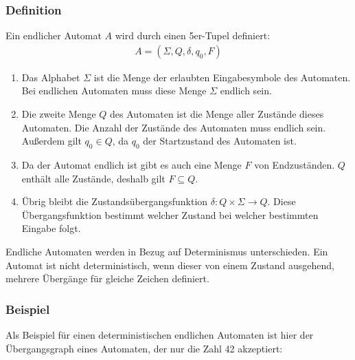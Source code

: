 \subsubsection{Definition}
\begin{flushleft}
Ein endlicher Automat $A$ wird durch einen 5er-Tupel definiert:
\begin{align}
    A=(\Sigma,Q,\delta,q_0,F)
\end{align}

\begin{enumerate}
    \item {
        Das Alphabet $\Sigma$ ist die Menge der erlaubten Eingabesymbole des Automaten.
        Bei endlichen Automaten muss diese Menge $\Sigma$ endlich sein.
    }
    \item {
        Die zweite Menge $Q$ des Automaten ist die Menge aller Zustände dieses
        Automaten.
        Die Anzahl der Zustände des Automaten muss endlich sein.
        Außerdem gilt $q_0 \in Q$, da $q_0$ der Startzustand des Automaten ist.
    }
    \item {
        Da der Automat endlich ist gibt es auch eine Menge $F$ von Endzuständen.
        $Q$ enthält alle Zustände, deshalb gilt $F \subseteq Q$.
    }
    \item {
        Übrig bleibt die Zustandsübergangsfunktion
        $\delta: Q \times \Sigma \rightarrow Q$.
        Diese Übergangsfunktion bestimmt welcher Zustand
        bei welcher bestimmten Eingabe folgt.
    }
\end{enumerate}

Endliche Automaten werden in Bezug auf Determinismus unterschieden.
Ein Automat ist nicht deterministisch, wenn dieser von einem Zustand ausgehend,
mehrere Übergänge für gleiche Zeichen definiert.
\end{flushleft}

\subsubsection{Beispiel}
\label{sec:Beispiel}
\begin{flushleft}
Als Beispiel für einen deterministischen endlichen Automaten ist hier
der Übergangsgraph eines Automaten, der nur die Zahl 42 akzeptiert:
\end{flushleft}

\begin{center}
\end{center}

